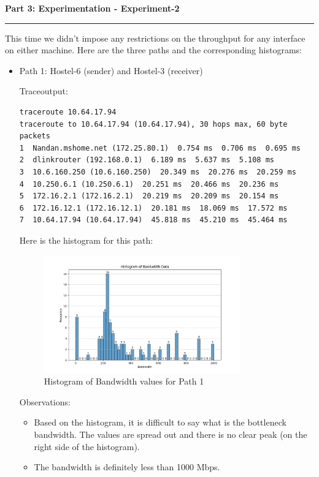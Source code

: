 \documentclass[a4paper,12pt]{article}
\newenvironment{solution}[2][]{%
    \begin{mdframed}[linecolor=blue!70!black, linewidth=2pt, roundcorner=10pt, backgroundcolor=yellow!10!white, skipabove=12pt, skipbelow=12pt]%
        \textbf{\large #2}
        \par\noindent\rule{\textwidth}{0.4pt}
}{
    \end{mdframed}
}
\begin{document}
\begin{solution}{Part 3: Experimentation - Experiment-2}
    This time we didn't impose any restrictions on the throughput for any interface on either machine. Here are the three paths and the corresponding histograms:
    \begin{itemize}
        \item Path 1: Hostel-6 (sender) and Hostel-3 (receiver)
        
        Traceoutput:
        \begin{verbatim}
traceroute 10.64.17.94
traceroute to 10.64.17.94 (10.64.17.94), 30 hops max, 60 byte packets
1  Nandan.mshome.net (172.25.80.1)  0.754 ms  0.706 ms  0.695 ms
2  dlinkrouter (192.168.0.1)  6.189 ms  5.637 ms  5.108 ms
3  10.6.160.250 (10.6.160.250)  20.349 ms  20.276 ms  20.259 ms
4  10.250.6.1 (10.250.6.1)  20.251 ms  20.466 ms  20.236 ms
5  172.16.2.1 (172.16.2.1)  20.219 ms  20.209 ms  20.154 ms
6  172.16.12.1 (172.16.12.1)  20.181 ms  18.069 ms  17.572 ms
7  10.64.17.94 (10.64.17.94)  45.818 ms  45.210 ms  45.464 ms
        \end{verbatim}

        Here is the histogram for this path:
        \begin{figure}[H]
            \centering
            \includegraphics[width=0.8\textwidth]{histograms/h6-h3-buffer_bandwidth_histogram.png}
            \caption{Histogram of Bandwidth values for Path 1}
        \end{figure}

        Observations:
\begin{itemize}
    \item Based on the histogram, it is difficult to say what is the bottleneck bandwidth. The values are spread out and there is no clear peak (on the right side of the histogram).
    \item The bandwidth is definitely less than 1000 Mbps.
\end{itemize}


\end{itemize}
\end{solution}
\end{document}
